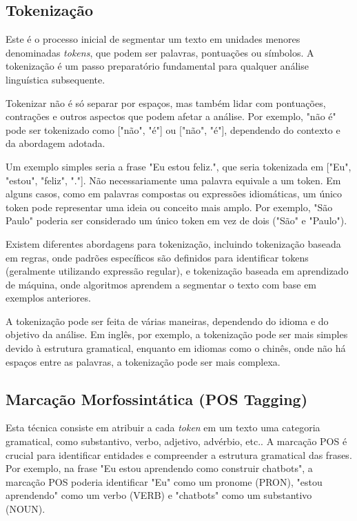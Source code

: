 \documentclass[14pt,a4paper,oneside]{book}
\begin{document}
\subsection{Tokenização}

Este é o processo inicial de segmentar um texto em unidades menores denominadas \textit{tokens}, que podem ser palavras, pontuações ou símbolos. A tokenização é um passo preparatório fundamental para qualquer análise linguística subsequente. 

Tokenizar não é só separar por espaços, mas também lidar com pontuações, contrações e outros aspectos que podem afetar a análise. Por exemplo, "não é" pode ser tokenizado como ["não", "é"] ou ["não", "é"], dependendo do contexto e da abordagem adotada. 

Um exemplo simples seria a frase "Eu estou feliz.", que seria tokenizada em ["Eu", "estou", "feliz", "."]. Não necessariamente uma palavra equivale a um token. Em alguns casos, como em palavras compostas ou expressões idiomáticas, um único token pode representar uma ideia ou conceito mais amplo. Por exemplo, "São Paulo" poderia ser considerado um único token em vez de dois ("São" e "Paulo"). 


Existem diferentes abordagens para tokenização, incluindo tokenização baseada em regras, onde padrões específicos são definidos para identificar tokens (geralmente utilizando expressão regular), e tokenização baseada em aprendizado de máquina, onde algoritmos aprendem a segmentar o texto com base em exemplos anteriores.

A tokenização pode ser feita de várias maneiras, dependendo do idioma e do objetivo da análise. Em inglês, por exemplo, a tokenização pode ser mais simples devido à estrutura gramatical, enquanto em idiomas como o chinês, onde não há espaços entre as palavras, a tokenização pode ser mais complexa.

\subsection{Marcação Morfossintática (POS Tagging)}

Esta técnica consiste em atribuir a cada \textit{token} em um texto uma categoria gramatical, como substantivo, verbo, adjetivo, advérbio, etc.. A marcação POS é crucial para identificar entidades e compreender a estrutura gramatical das frases. Por exemplo, na frase "Eu estou aprendendo como construir chatbots", a marcação POS poderia identificar "Eu" como um pronome (PRON), "estou aprendendo" como um verbo (VERB) e "chatbots" como um substantivo (NOUN).
\end{document}
